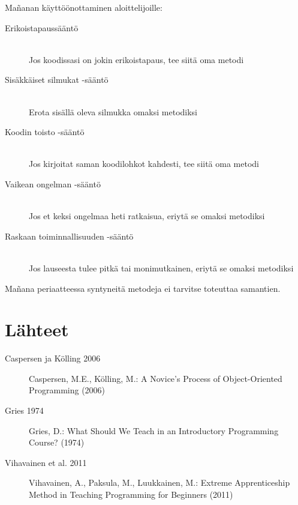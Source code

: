 \documentclass[a4paper]{article}
\begin{document}
Mañanan käyttöönottaminen aloittelijoille:

\begin{description}
  \item[Erikoistapaussääntö] \hfill \\
  Jos koodissasi on jokin erikoistapaus, tee siitä oma metodi
  \item[Sisäkkäiset silmukat -sääntö] \hfill \\
  Erota sisällä oleva silmukka omaksi metodiksi
  \item[Koodin toisto -sääntö] \hfill \\
  Jos kirjoitat saman koodilohkot kahdesti, tee siitä oma metodi
  \item[Vaikean ongelman -sääntö] \hfill \\
  Jos et keksi ongelmaa heti ratkaisua, eriytä se omaksi metodiksi
  \item[Raskaan toiminnallisuuden -sääntö] \hfill \\
  Jos lauseesta tulee pitkä tai monimutkainen, eriytä se omaksi metodiksi
\end{description}

Mañana periaatteessa syntyneitä metodeja ei tarvitse toteuttaa samantien.


\newpage

\section{Lähteet}

\begin{description}
  \item [Caspersen ja Kölling 2006] Caspersen, M.E., Kölling, M.: A Novice's Process of Object-Oriented Programming (2006)
  \item [Gries 1974] Gries, D.: What Should We Teach in an Introductory Programming Course? (1974)
  \item [Vihavainen et al. 2011] Vihavainen, A., Paksula, M., Luukkainen, M.: Extreme Apprenticeship Method in Teaching Programming for Beginners (2011)
\end{description}
\end{document}
